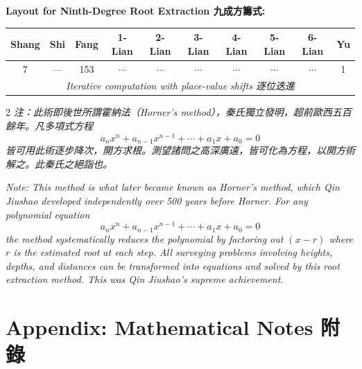 \documentclass[11pt,a4paper]{article}
\begin{document}
\vspace{0.5em}

\noindent\textbf{Layout for Ninth-Degree Root Extraction 九成方籌式:}
\begin{center}
\begin{tabular}{|c|c|c|c|c|c|c|c|c|c|}
\hline
Shang & Shi & Fang & 1-Lian & 2-Lian & 3-Lian & 4-Lian & 5-Lian & 6-Lian & Yu \\
\hline
7 & --- & 153 & $\cdots$ & $\cdots$ & $\cdots$ & $\cdots$ & $\cdots$ & $\cdots$ & 1 \\
\hline
\multicolumn{10}{|c|}{\textit{Iterative computation with place-value shifts 逐位迭進}} \\
\hline
\end{tabular}
\end{center}

\begin{paracol}{2}
\switchcolumn[0]
\noindent\textit{注：此術即後世所謂霍納法（Horner's method），秦氏獨立發明，超前歐西五百餘年。凡多項式方程
\[
a_n x^n + a_{n-1} x^{n-1} + \cdots + a_1 x + a_0 = 0
\]
皆可用此術逐步降次，開方求根。測望諸問之高深廣遠，皆可化為方程，以開方術解之。此秦氏之絕詣也。}

\switchcolumn[1]
\noindent\textit{Note: This method is what later became known as Horner's method, which Qin Jiushao developed independently over 500 years before Horner. For any polynomial equation
\[
a_n x^n + a_{n-1} x^{n-1} + \cdots + a_1 x + a_0 = 0
\]
the method systematically reduces the polynomial by factoring out $(x - r)$ where $r$ is the estimated root at each step. All surveying problems involving heights, depths, and distances can be transformed into equations and solved by this root extraction method. This was Qin Jiushao's supreme achievement.}
\end{paracol}

\newpage

\section*{Appendix: Mathematical Notes 附錄}
\end{document}
